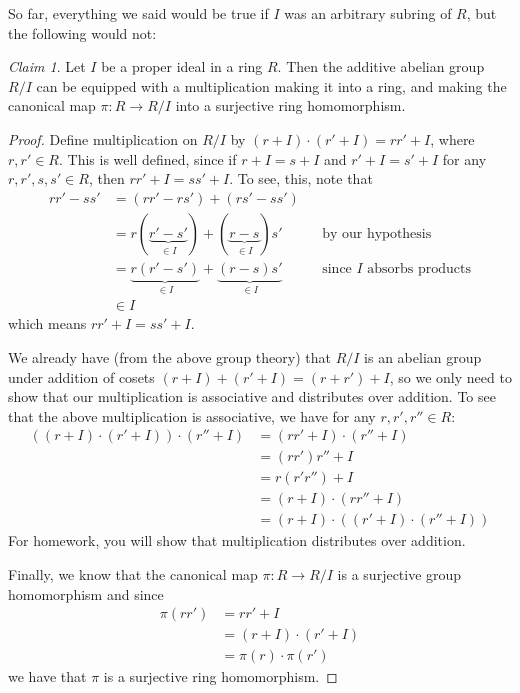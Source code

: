 \documentclass[12pt,letterpaper,DIV=11,final]{scrartcl}
\theoremstyle{plain}
\theoremstyle{definition}
\theoremstyle{remark}
\newtheorem{claim}{Claim}
\begin{document}
So far, everything we said would be true if $I$ was an arbitrary subring of $R$, but the following would not:

\begin{claim}\label{claim:abelianmult_ring}
  Let $I$ be a proper ideal in a ring $R$.
  Then the additive abelian group $R/I$ can be equipped with a multiplication making it into a ring, and making the canonical map $\pi : R \to R/I$ into a surjective ring homomorphism.

  \begin{proof}
    Define multiplication on $R/I$ by $(r + I) \cdot (r' + I) = rr' + I$, where $r, r' \in R$.
    This is well defined, since if $r + I = s + I$ and $r' + I = s' + I$ for any $r, r', s, s' \in R$, then $rr' + I = ss' + I$.
    To see, this, note that
    \begin{align*}
      rr' - ss' &= (rr' - rs') + (rs' - ss') \\
                &= r (\underbrace{r' - s'}_{\in I}) + (\underbrace{r - s}_{\in I}) s' && \text{by our hypothesis} \\
                &= \underbrace{r (r' - s')}_{\in I} + \underbrace{(r - s) s'}_{\in I} && \text{since $I$ absorbs products} \\
                &\in I
    \end{align*}
    which means $rr' + I = ss' + I$.

    We already have (from the above group theory) that $R/I$ is an abelian group under addition of cosets $(r + I) + (r' + I) = (r + r') + I$,
    so we only need to show that our multiplication is associative and distributes over addition.
    To see that the above multiplication is associative, we have for any $r, r', r'' \in R$:
    \begin{align*}
      \left( (r + I) \cdot (r' + I) \right) \cdot (r'' + I) &= (rr' + I) \cdot (r'' + I) \\
                                                            &= (rr') r'' + I \\
                                                            &= r (r' r'') + I \\
                                                            &= (r + I) \cdot (r r'' + I) \\
                                                            &= (r + I) \cdot \left( (r' + I) \cdot (r'' + I) \right)
    \end{align*}
    For homework, you will show that multiplication distributes over addition.

    Finally, we know that the canonical map $\pi : R \to R/I$ is a surjective group homomorphism and since
    \begin{align*}
      \pi(r r') &= r r' + I \\
                &= (r + I) \cdot (r' + I) \\
                &= \pi(r) \cdot \pi(r')
    \end{align*}
    we have that $\pi$ is a surjective ring homomorphism.
  \end{proof}
\end{claim}
\end{document}
